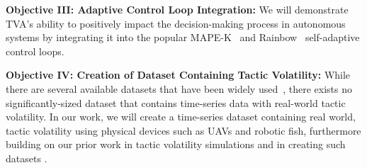 \documentclass[12pt]{article}
\newcommand{\etc}{etc.\xspace}
\begin{document}
\vspace{1mm} \noindent \textbf{Objective III: Adaptive Control Loop Integration:} We will demonstrate TVA's ability to positively impact the decision-making process in autonomous systems by integrating it into the popular MAPE-K~\cite{kephart2003vision} and Rainbow~\cite{garlan2004rainbow} self-adaptive control loops. %

\vspace{1mm} \noindent \textbf{Objective IV: Creation of Dataset Containing Tactic Volatility:} While there are several available datasets that have been widely used~\cite{SEAMS_Artifacts_URL, traffic_Archive_URL}, there exists no significantly-sized dataset that contains time-series data with real-world tactic volatility. %
In our work, we will create a time-series dataset containing real world, tactic volatility using physical devices such as UAVs and robotic fish, furthermore building on our prior work in tactic volatility simulations and in creating such datasets \cite{VALET_TOOL_URL}. 



\end{document}
